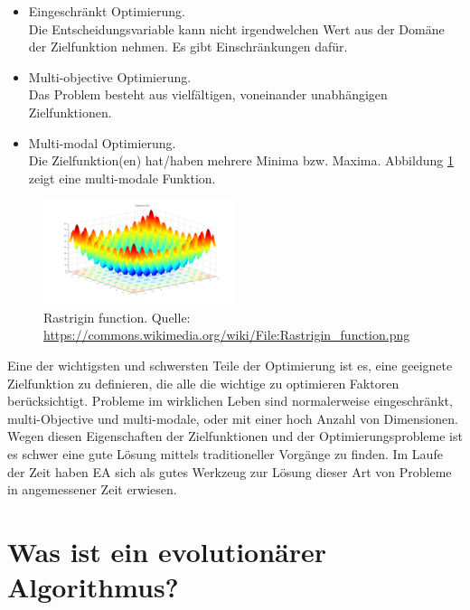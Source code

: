 \documentclass[twoside,twocolumn]{article}
\begin{document}
\begin{itemize}
\item{Eingeschränkt Optimierung.}\\
Die Entscheidungsvariable kann nicht irgendwelchen Wert aus der Domäne der Zielfunktion nehmen. Es gibt Einschränkungen dafür.\\
\item{Multi-objective Optimierung.}\\
Das Problem besteht aus vielfältigen, voneinander unabhängigen Zielfunktionen.\\
\item{Multi-modal Optimierung.}\\
Die Zielfunktion(en) hat/haben mehrere Minima bzw. Maxima. Abbildung \ref{fig:rastrigin} zeigt eine multi-modale Funktion.
\end{itemize}

\begin{figure}[h]
\caption{Rastrigin function. Quelle: \url{https://commons.wikimedia.org/wiki/File:Rastrigin_function.png}}
\label{fig:rastrigin}
\centering
\includegraphics[width=0.5\textwidth]{images/rastrigin_function.png}
\end{figure}

Eine der wichtigsten und schwersten Teile der Optimierung ist es, eine geeignete Zielfunktion zu definieren, die alle die wichtige zu optimieren Faktoren berücksichtigt.
Probleme im wirklichen Leben sind normalerweise eingeschränkt, multi-Objective und multi-modale, oder mit einer hoch Anzahl von Dimensionen. Wegen diesen Eigenschaften der Zielfunktionen und der Optimierungsprobleme ist es schwer eine gute Lösung mittels traditioneller Vorgänge zu finden. Im Laufe der Zeit haben EA sich als gutes Werkzeug zur Lösung dieser Art von Probleme in angemessener Zeit erwiesen.


\section{Was ist ein evolutionärer Algorithmus?}
\end{document}
